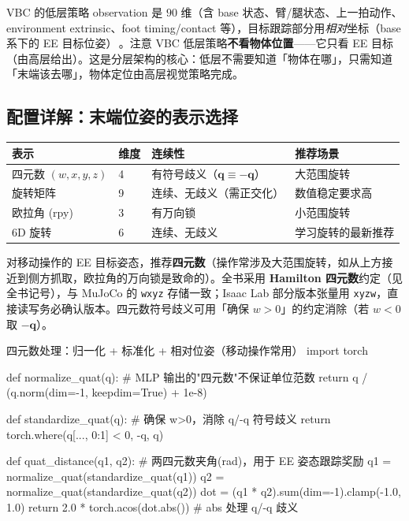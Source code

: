 VBC 的低层策略 observation 是 $90$ 维（含 base 状态、臂/腿状态、上一拍动作、environment extrinsic、foot timing/contact 等），目标跟踪部分用\emph{相对}坐标（base 系下的 EE 目标位姿）\,\cite{liu2024vbc}。注意 VBC 低层策略\textbf{不看物体位置}——它只看 EE 目标（由高层给出）。这是分层架构的核心：低层不需要知道「物体在哪」，只需知道「末端该去哪」，物体定位由高层视觉策略完成。

\subsection{配置详解：末端位姿的表示选择}
\label{sec:rlmc-lm-obs-quat}

\begin{center}
\small
\begin{tabular}{@{}llll@{}}
\toprule
表示 & 维度 & 连续性 & 推荐场景 \\
\midrule
四元数 $(w,x,y,z)$ & 4 & 有符号歧义（$\mathbf q\equiv-\mathbf q$） & 大范围旋转 \\
旋转矩阵 & 9 & 连续、无歧义（需正交化） & 数值稳定要求高 \\
欧拉角 (rpy) & 3 & 有万向锁 & 小范围旋转 \\
6D 旋转 & 6 & 连续、无歧义 & 学习旋转的最新推荐 \\
\bottomrule
\end{tabular}
\end{center}

对移动操作的 EE 目标姿态，推荐\textbf{四元数}（操作常涉及大范围旋转，如从上方接近到侧方抓取，欧拉角的万向锁是致命的）。全书采用 \textbf{Hamilton 四元数}约定（见全书记号），与 MuJoCo 的 \verb|wxyz| 存储一致；Isaac Lab 部分版本张量用 \verb|xyzw|，直接读写务必确认版本。四元数符号歧义可用「确保 $w>0$」的约定消除（若 $w<0$ 取 $-\mathbf q$）。

\begin{codebox}[Python]{四元数处理：归一化 + 标准化 + 相对位姿（移动操作常用）}
import torch

def normalize_quat(q):                 # MLP 输出的"四元数"不保证单位范数
    return q / (q.norm(dim=-1, keepdim=True) + 1e-8)

def standardize_quat(q):               # 确保 w>0，消除 q/-q 符号歧义
    return torch.where(q[..., 0:1] < 0, -q, q)

def quat_distance(q1, q2):             # 两四元数夹角(rad)，用于 EE 姿态跟踪奖励
    q1 = normalize_quat(standardize_quat(q1))
    q2 = normalize_quat(standardize_quat(q2))
    dot = (q1 * q2).sum(dim=-1).clamp(-1.0, 1.0)
    return 2.0 * torch.acos(dot.abs())  # abs 处理 q/-q 歧义
\end{codebox}

